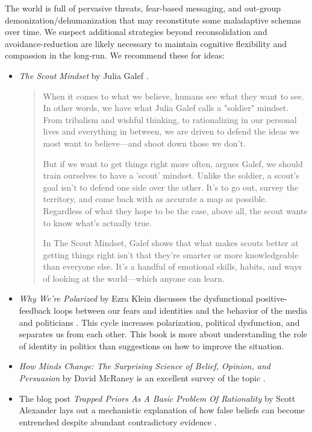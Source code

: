 \documentclass[12pt,letterpaper]{book}
\begin{document}
The world is full of pervasive threats, fear-based messaging, and out-group demonization/dehumanization that may reconstitute some maladaptive schemas over time. We suspect additional strategies beyond reconsolidation and avoidance-reduction are likely necessary to maintain cognitive flexibility and compassion in the long-run. We recommend these for ideas:
\begin{itemize}
    \item \textit{The Scout Mindset} by Julia Galef \cite{galefScoutMindset}.
    \begin{quotation}
        When it comes to what we believe, humans see what they want to see. In other words, we have what Julia Galef calls a "soldier" mindset. From tribalism and wishful thinking, to rationalizing in our personal lives and everything in between, we are driven to defend the ideas we most want to believe—and shoot down those we don't.

        But if we want to get things right more often, argues Galef, we should train ourselves to have a 'scout' mindset. Unlike the soldier, a scout's goal isn't to defend one side over the other. It's to go out, survey the territory, and come back with as accurate a map as possible. Regardless of what they hope to be the case, above all, the scout wants to know what's actually true.
        
        In The Scout Mindset, Galef shows that what makes scouts better at getting things right isn't that they're smarter or more knowledgeable than everyone else. It's a handful of emotional skills, habits, and ways of looking at the world—which anyone can learn.
    \end{quotation}
    \item \textit{Why We're Polarized} by Ezra Klein discusses the dysfunctional positive-feedback loops between our fears and identities and the behavior of the media and politicians \cite{klein2020Polarized}. This cycle increases polarization, political dysfunction, and separates us from each other. This book is more about understanding the role of identity in politics than suggestions on how to improve the situation.
    \item \textit{How Minds Change: The Surprising Science of Belief, Opinion, and Persuasion} by David McRaney is an excellent survey of the topic \cite{mcraneyMinds}.
    \item The blog post \textit{Trapped Priors As A Basic Problem Of Rationality} by Scott Alexander lays out a mechanistic explanation of how false beliefs can become entrenched despite abundant contradictory evidence \cite{alexanderTrapped}.
\end{itemize}
\end{document}

